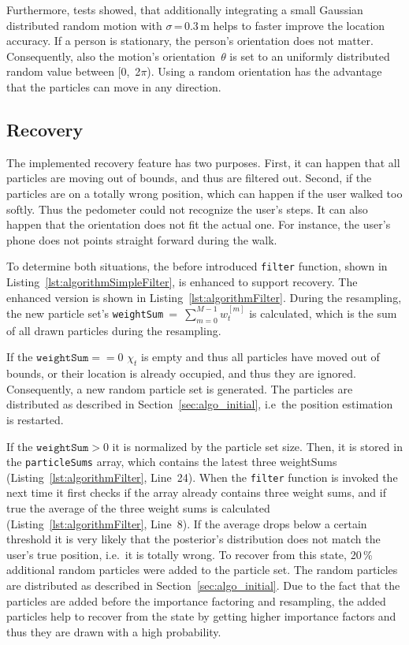 Furthermore, tests showed, that additionally integrating a small Gaussian distributed random motion with $\sigma$\,=\,0.3\,m helps to faster improve the location accuracy. If a person is stationary, the person's orientation does not matter. Consequently, also the motion's orientation~$\theta$ is set to an uniformly distributed random value between [0,~2$\pi$). Using a random orientation has the advantage that the particles can move in any direction.




\subsection{Recovery}\label{sec:algo_recovery}
The implemented recovery feature has two purposes. First, it can happen that all particles are moving out of bounds, and thus are filtered out. Second, if the particles are on a totally wrong position, which can happen if the user walked too softly. Thus the pedometer could not recognize the user's steps. It can also happen that the orientation does not fit the actual one. For instance, the user's phone does not points straight forward during the walk.



To determine both situations, the before introduced \texttt{filter} function, shown in Listing~\ref{lst:algorithmSimpleFilter}, is enhanced to support recovery. The enhanced version is shown in Listing~\ref{lst:algorithmFilter}. During the resampling, the new particle set's \texttt{weightSum}~=~$\sum_{m = 0}^{M-1} w^{[m]}_t$ is calculated, which is the sum of all drawn particles during the resampling.

If the $\texttt{weightSum} == 0$ $\chi_t$ is empty and thus all particles have moved out of bounds, or their location is already occupied, and thus they are ignored. Consequently, a new random particle set is generated. The particles are distributed as described in Section~\ref{sec:algo_initial}, i.e\ the position estimation is restarted.

If the $\texttt{weightSum} > 0$ it is normalized by the particle set size. Then, it is stored in the \texttt{particleSums} array, which contains the latest three weightSums (Listing~\ref{lst:algorithmFilter}, Line~24). When the \texttt{filter} function is invoked the next time it first checks if the array already contains three weight sums, and if true the average of the three weight sums is calculated (Listing~\ref{lst:algorithmFilter}, Line~8). If the average drops below a certain threshold it is very likely that the posterior's distribution does not match the user's true position, i.e.\ it is totally wrong. To recover from this state, 20\,\% additional random particles were added to the particle set. The random particles are distributed as described in Section~\ref{sec:algo_initial}. Due to the fact that the particles are added before the importance factoring and resampling, the added particles help to recover from the state by getting higher importance factors and thus they are drawn with a high probability.

